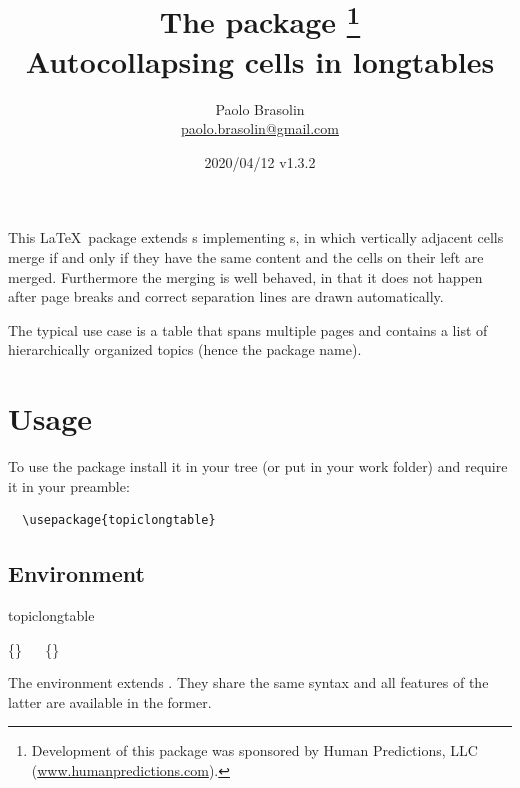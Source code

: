 \documentclass[full,kernel]{l3doc}
\begin{document}
\title{%
  The  package%
  \thanks{Development of this package was sponsored by Human Predictions,
    LLC (\href{http://www.humanpredictions.com}{www.humanpredictions.com}).}\\
  Autocollapsing cells in longtables
}

\author{
  Paolo Brasolin\\
  \href{mailto:paolo.brasolin@gmail.com}{paolo.brasolin@gmail.com}
}

\date{2020/04/12 v1.3.2}

\maketitle

\begin{documentation}


This \LaTeX\ package extends s implementing
s, in which vertically adjacent cells merge if
and only if they have the same content and the cells on their left
are merged.  Furthermore the merging is well behaved, in that it
does not happen after page breaks and correct separation lines are
drawn automatically.

The typical use case is a table that spans multiple pages and
contains a list of hierarchically organized topics (hence the package
name).




\section*{Usage}

To use the package install it in your tree (or put  in your work folder) and require it in your preamble:

\begin{verbatim}
  \usepackage{topiclongtable}
\end{verbatim}




\subsection*{Environment}

\begin{function}[updated=2019-07-08]{topiclongtable}
  \begin{syntax}
    \{\}
    \ \ 
    \{\}
  \end{syntax}
  The  environment extends .
  They share the same syntax and all features of the latter are
  available in the former.


\end{function}
\end{documentation}
\end{document}
